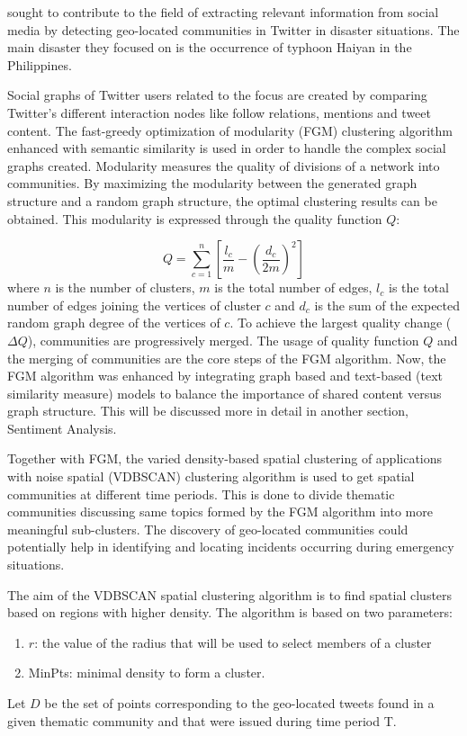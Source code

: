  sought to contribute to the field of extracting relevant information from social media by detecting geo-located communities in Twitter in disaster situations. The main disaster they focused on is the occurrence of typhoon Haiyan in the Philippines. 

Social graphs of Twitter users related to the focus are created by comparing Twitter's different interaction nodes like follow relations, mentions and tweet content. The fast-greedy optimization of modularity (FGM) clustering algorithm enhanced with semantic similarity is used in order to handle the complex social graphs created. Modularity measures the quality of divisions of a network into communities. By maximizing the modularity between the generated graph structure and a random graph structure, the optimal clustering results can be obtained. This modularity is expressed through the quality function $Q$:

\begin{equation}
Q = \sum_{c = 1}^{n} \left [ \frac{l_c}{m} - \left (\frac{d_c}{2m} \right )^2 \right ]
\end{equation}where $n$ is the number of clusters, $m$ is the total number of edges, $l_c$ is the total number of edges joining the vertices of cluster $c$ and $d_c$ is the sum of the expected random graph degree of the vertices of $c$. To achieve the largest quality change ($\Delta$$Q$), communities are progressively merged. The usage of quality function $Q$ and the merging of communities are the core steps of the FGM algorithm. Now, the FGM algorithm was enhanced by integrating graph based and text-based (text similarity measure) models to balance the importance of shared content versus graph structure. This will be discussed more in detail in another section, Sentiment Analysis.

Together with FGM, the varied density-based spatial clustering of applications with noise spatial (VDBSCAN) clustering algorithm is used to get spatial communities at different time periods. This is done to divide thematic communities discussing same topics formed by the FGM algorithm into more meaningful sub-clusters. The discovery of geo-located communities could potentially help in identifying and locating incidents occurring during emergency situations.

The aim of the VDBSCAN spatial clustering algorithm is to find spatial clusters based on regions with higher density. The algorithm is based on two parameters:
\begin{enumerate}
	\item $r$: the value of the radius that will be used to select members of a cluster
	\item MinPts: minimal density to form a cluster.
\end{enumerate}
Let $D$ be the set of points corresponding to the geo-located tweets found in a given thematic community and that were issued during time period T.

